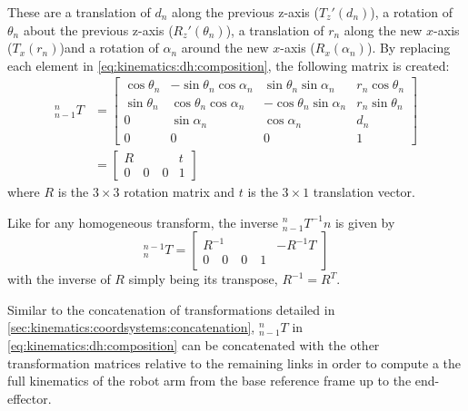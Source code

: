 %
These are a translation of $d_n$ along the previous z-axis ($T_z'(d_n)$), a rotation of $\theta_n$ about the previous z-axis ($R_z'(\theta_n)$), a translation of $r_n$ along the new $x$-axis ($T_x(r_n)$)and a rotation of $\alpha_n$ around the new $x$-axis ($R_x(\alpha_n)$).
%
By replacing each element in \cref{eq:kinematics:dh:composition}, the following matrix is created:
\begin{eqnarray}
_{n-1}^nT&=
\left[
\begin{array}{ccc|c}
\cos \theta_n & -\sin \theta_n \cos\alpha_n & \sin\theta_n \sin\alpha_n & r_n \cos\theta_n\\
\sin \theta_n & \cos\theta_n \cos\alpha_n & -\cos\theta_n\sin\alpha_n & r_n \sin\theta_n\\
0 & \sin\alpha_n & \cos\alpha_n & d_n \nonumber \\
\hline
0 & 0 & 0 & 1
\end{array}
\right]\\
&=
\left[
\begin{array}{c|c}
R & t\\
\hline
0 \quad 0 \quad 0 & 1
\end{array}
\right]
\end{eqnarray}
where $R$ is the $3\times3$ rotation matrix and $t$ is the $3\times1$ translation vector.

Like for any homogeneous transform, the inverse $_{n-1}^nT^{-1}n$ is given by
\begin{equation}
^{n-1}_nT=\left[
\begin{array}{c|c}
R^{-1} & -R^{-1}T\\
\hline
0 \quad 0 \quad 0 \quad 1
\end{array}
\right]
\end{equation}
with the inverse of $R$ simply being its transpose, $R^{-1}=R^T$.

Similar to the concatenation of transformations detailed in \cref{sec:kinematics:coordsystems:concatenation}, $_{n-1}^nT$ in \cref{eq:kinematics:dh:composition} can be concatenated with the other transformation matrices relative to the remaining links in order to compute a the full kinematics of the robot arm from the base reference frame up to the end-effector.

